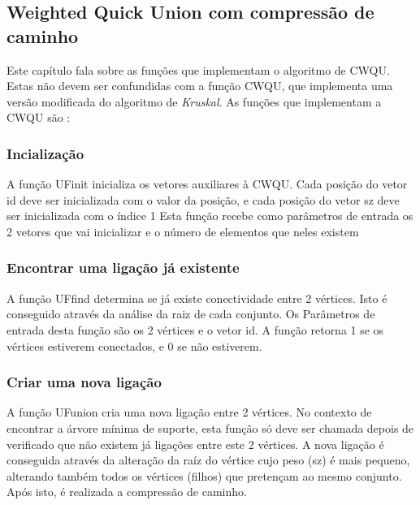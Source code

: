 \documentclass[14pt]{article}
\begin{document}
    \subsection[CWQU]{Weighted Quick Union com compressão de caminho}
    Este capítulo fala sobre as funções que implementam o algoritmo de CWQU.
    Estas não devem ser confundidas com a função CWQU, que implementa uma versão modificada do algoritmo de \emph{Kruskal}.
    As funções que implementam a CWQU são :
    \subsubsection[UFinit]{Incialização}
    A função UFinit inicializa os vetores auxiliares à CWQU. Cada posição do vetor id deve ser inicializada com o valor da posição, e cada posição do vetor sz deve ser inicializada com o índice 1
    Esta função recebe como parâmetros de entrada os 2 vetores que vai inicializar e o número de elementos que neles existem

    \subsubsection[UFfind]{Encontrar uma ligação já existente}
    A função UFfind determina se já existe conectividade entre 2 vértices. Isto é conseguido através da análise da raiz de cada conjunto.
    Os Parâmetros de entrada desta função são os 2 vértices e o vetor id. A função retorna 1 se os vértices estiverem conectados, e 0 se não estiverem.

    \subsubsection[UFunion]{Criar uma nova ligação}
    A função UFunion cria uma nova ligação entre 2 vértices. No contexto de encontrar a árvore mínima de suporte, esta função só deve ser
    chamada depois de verificado que não existem já ligações entre este 2 vértices. A nova ligação é conseguida através da alteração
    da raíz do vértice cujo peso (sz) é mais pequeno, alterando também todos os vértices (filhos) que pretençam ao mesmo conjunto. Após isto, é realizada a compressão de caminho.
\end{document}
